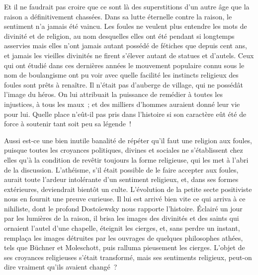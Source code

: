 \documentclass[french,twoside]{book} %
\begin{document}
Et il ne faudrait pas croire que ce sont là des superstitions d’un autre âge que la raison a définitivement chassées. Dans sa lutte éternelle contre la raison, le sentiment n’a jamais été vaincu. Les foules ne veulent plus entendre les mots de divinité et de religion, au nom desquelles elles ont été pendant si longtemps asservies mais elles n’ont jamais autant possédé de fétiches que depuis cent ans, et jamais les vieilles divinités ne firent s’élever autant de statues et d’autels. Ceux qui ont étudié dans ces dernières années le mouvement populaire connu sous le nom de boulangisme ont pu voir avec quelle facilité les instincts religieux des foules sont prêts à renaître. Il n’était pas d’auberge de village, qui ne possédât l’image du héros. On lui attribuait la puis­sance de remédier à toutes les injustices, à tous les maux ; et des milliers d’hommes auraient donné leur vie pour lui. Quelle place n’eût-il pas pris dans l’histoire si son caractère eût été de force à soutenir tant soit peu sa légende !\par
Aussi est-ce une bien inutile banalité de répéter qu’il faut une religion aux foules, puisque toutes les croyances politiques, divines et sociales ne s’établissent chez elles qu’à la condition de revêtir toujours la forme religieuse, qui les met à l’abri de la dis­cussion. L’athéisme, s’il était possible de le faire accepter aux foules, aurait toute l’ardeur intolérante d’un sentiment religieux, et, dans ses formes extérieures, devien­drait bientôt un culte. L’évolution de la petite secte positiviste nous en fournit une preuve curieuse. Il lui est arrivé bien vite ce qui arriva à ce nihiliste, dont le profond Dostoïewsky nous rapporte l’histoire. Éclairé un jour par les lumières de la raison, il brisa les images des divinités et des saints qui ornaient l’autel d’une chapelle, éteignit les cierges, et, sans perdre un instant, remplaça les images détruites par les ouvrages de quelques philosophes athées, tels que Büchner et Moleschott, puis ralluma pieusement les cierges. L’objet de ses croyances religieuses s’était transformé, mais ses sentiments religieux, peut-on dire vraiment qu’ils avaient changé ?\par
\end{document}
